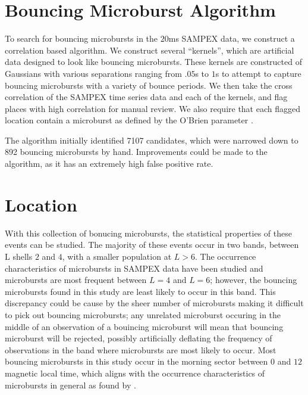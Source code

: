 \documentclass[draft]{agujournal2019}
\begin{document}
 
\section{Bouncing Microburst Algorithm}
To search for bouncing microbursts in the $20$ms SAMPEX data, we construct a correlation based algorithm. %
We construct several ``kernels'', which are artificial data designed to look like bouncing microbursts. 
These kernels are constructed of Gaussians with various separations ranging from $.05$s to $1$s to attempt to capture bouncing microbursts with a variety of bounce periods. 
We then take the cross correlation of the SAMPEX time series data and each of the kernels, and flag places with high correlation for manual review. 
We also require that each flagged location contain a microburst as defined by the O'Brien parameter \cite{obrien_parameter}. 

The algorithm initially identified 7107 candidates, which were narrowed down to 892 bouncing microbursts by hand. 
Improvements could be made to the algorithm, as it has an extremely high false positive rate. 

\section{Location}
With this collection of bonucing microbursts, the statistical properties of these events can be studied. 
The majority of these events occur in two bands, between L shells $2$ and $4$, with a smaller population at $L>6$. 
The occurrence characteristics of microbursts in SAMPEX data have been studied \cite{burst_occurrence} and microbursts are most frequent between $L=4$ and $L=6$; however, the bouncing microbursts found in this study are least likely to occur in this band. 
This discrepancy could be cause by the sheer number of microbursts making it difficult to pick out bouncing microbursts; any unrelated microburst occuring in the middle of an observation of a bouincing microburst will mean that bouncing microburst will be rejected, possibly artificially deflating the frequency of observations in the band where microbursts are most likely to occur. 
Most bouncing microbursts in this study occur in the morning sector between $0$ and $12$ magnetic local time, which aligns with the occurrence characteristics of microbursts in general as found by .
\end{document}

